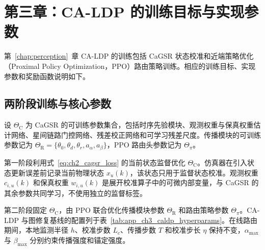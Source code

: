 \chapter{第三章：CA-LDP 的训练目标与实现参数}
\label{app:ch3_training_details}

第~\ref{chap:perception}~章 CA-LDP 的训练包括 CaGSR 状态校准和近端策略优化（Proximal Policy Optimization，PPO）路由策略训练。相应的训练目标、实现参数和奖励函数说明如下。

\section{两阶段训练与核心参数}

设 $\Theta_{\mathrm C}$ 为 CaGSR 的可训练参数集合，包括时序先验模块、观测权重与保真权重估计网络、星间链路门控网络、残差校正网络和可学习残差尺度。传播模块的可训练参数记为 $\Theta_{\mathrm R}=\{\theta_0,\theta_d,\theta_r,a_\alpha,a_\beta\}$，PPO 路由头参数记为 $\Theta_\pi$。

第一阶段利用式~\eqref{eq:ch2_cagsr_loss} 的当前状态监督优化 $\Theta_{\mathrm C}$。仿真器在引入状态更新误差前记录当前物理状态 $x_u(k)$，该状态只用于监督状态校准。观测权重 $c_{i,u}(k)$ 和保真权重 $w_{i,u}(k)$ 是展开校准算子中的可微内部变量，与 CaGSR 的其余参数共同学习，不使用独立的监督标签。

第二阶段固定 $\Theta_{\mathrm C}$，由 PPO 联合优化传播模块参数 $\Theta_{\mathrm R}$ 和路由策略参数 $\Theta_\pi$。CA-LDP 与图修复基线的配置列于表~\ref{tab:app_ch3_caldp_hyperparams}。在线路由期间，本地监测半径 $h$、校准步数 $L_c$、传播步数 $T$ 和校准步长 $\eta$ 保持不变，$\alpha_{\max}$ 与 $\beta_{\max}$ 分别约束传播强度和锚定强度。

